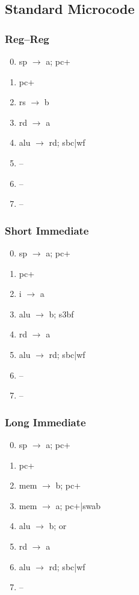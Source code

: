 \documentclass[11pt]{book}
\begin{document}
\subsection*{Standard Microcode}
\begin{multicols}{3}\ttfamily\selectfont\small
  \subsubsection*{Reg--Reg}
  \begin{enumerate}\setcounter{enumi}{-1}
  \item sp \(\rightarrow\) a; pc+
  \item pc+
  \item rs \(\rightarrow\) b
  \item rd \(\rightarrow\) a
  \item alu \(\rightarrow\) rd; sbc|wf
  \item --
  \item --
  \item --
  \end{enumerate}
  \columnbreak
  \subsubsection*{Short Immediate}
  \begin{enumerate}\setcounter{enumi}{-1}
  \item sp \(\rightarrow\) a; pc+
  \item pc+
  \item i \(\rightarrow\) a
  \item alu \(\rightarrow\) b; s3bf
  \item rd \(\rightarrow\) a
  \item alu \(\rightarrow\) rd; sbc|wf
  \item --
  \item --
  \end{enumerate}
  \columnbreak
  \subsubsection*{Long Immediate}
  \begin{enumerate}\setcounter{enumi}{-1}
  \item sp \(\rightarrow\) a; pc+
  \item pc+
  \item mem \(\rightarrow\) b; pc+
  \item mem \(\rightarrow\) a; pc+|swab
  \item alu \(\rightarrow\) b; or
  \item rd \(\rightarrow\) a
  \item alu \(\rightarrow\) rd; sbc|wf
  \item --
  \end{enumerate}
\end{multicols}
\end{document}
